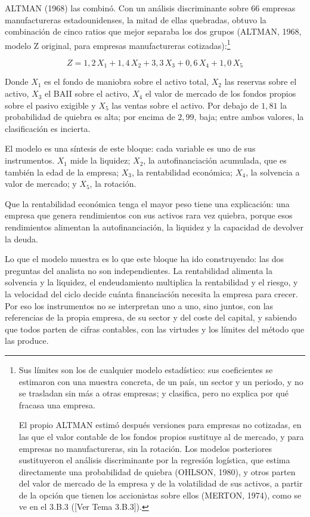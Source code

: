 \documentclass[10pt,a4paper]{article}
\newcommand{\authorfont}[1]{{\fontfamily{EBGaramond-TLF}\selectfont #1}}
\begin{document}
ALTMAN (1968) las combinó. Con un análisis discriminante sobre $66$ empresas manufactureras estadounidenses, la mitad de ellas quebradas, obtuvo la combinación de cinco ratios que mejor separaba los dos grupos (ALTMAN, 1968, modelo Z original, para empresas manufactureras cotizadas):\footnote{%
    Sus límites son los de cualquier modelo estadístico: sus coeficientes se estimaron con una muestra concreta, de un país, un sector y un periodo, y no se trasladan sin más a otras empresas; y clasifica, pero no explica por qué fracasa una empresa.
    
    El propio ALTMAN estimó después versiones para empresas no cotizadas, en las que el valor contable de los fondos propios sustituye al de mercado, y para empresas no manufactureras, sin la rotación. Los modelos posteriores sustituyeron el análisis discriminante por la regresión logística, que estima directamente una probabilidad de quiebra (OHLSON, 1980), y otros parten del valor de mercado de la empresa y de la volatilidad de sus activos, a partir de la opción que tienen los accionistas sobre ellos (MERTON, 1974), como se ve en el 3.B.3 ([\authorfont{Ver Tema 3.B.3}]).
}

$$Z=1{,}2\,X_1+1{,}4\,X_2+3{,}3\,X_3+0{,}6\,X_4+1{,}0\,X_5$$

Donde $X_1$ es el fondo de maniobra sobre el activo total, $X_2$ las reservas sobre el activo, $X_3$ el BAII sobre el activo, $X_4$ el valor de mercado de los fondos propios sobre el pasivo exigible y $X_5$ las ventas sobre el activo. Por debajo de $1{,}81$ la probabilidad de quiebra es alta; por encima de $2{,}99$, baja; entre ambos valores, la clasificación es incierta.

El modelo es una síntesis de este bloque: cada variable es uno de sus instrumentos. $X_1$ mide la liquidez; $X_2$, la autofinanciación acumulada, que es también la edad de la empresa; $X_3$, la rentabilidad económica; $X_4$, la solvencia a valor de mercado; y $X_5$, la rotación. 

Que la rentabilidad económica tenga el mayor peso tiene una explicación: una empresa que genera rendimientos con sus activos rara vez quiebra, porque esos rendimientos alimentan la autofinanciación, la liquidez y la capacidad de devolver la deuda. 

Lo que el modelo muestra es lo que este bloque ha ido construyendo: las dos preguntas del analista no son independientes. La rentabilidad alimenta la solvencia y la liquidez, el endeudamiento multiplica la rentabilidad y el riesgo, y la velocidad del ciclo decide cuánta financiación necesita la empresa para crecer. Por eso los instrumentos no se interpretan uno a uno, sino juntos, con las referencias de la propia empresa, de su sector y del coste del capital, y sabiendo que todos parten de cifras contables, con las virtudes y los límites del método que las produce.
\end{document}
